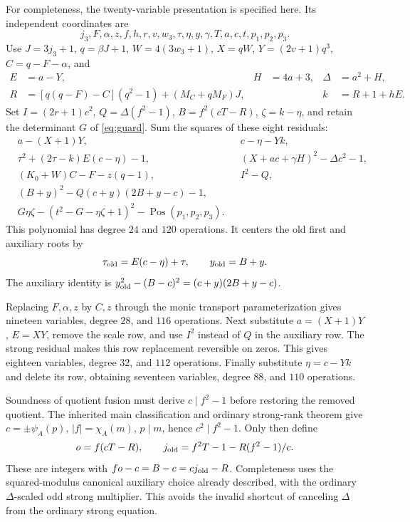 \documentclass[11pt,a4paper]{article}
\theoremstyle{definition}\newtheorem{definition}[theorem]{Definition}
\theoremstyle{remark}\newtheorem{remark}[theorem]{Remark}
\newcommand{\pos}{\operatorname{Pos}}\newcommand{\Pair}{\operatorname{Pair}}
\numberwithin{equation}{section}
\begin{document}
For completeness, the twenty-variable presentation is specified here.
Its independent coordinates are
\[
j_3,F,\alpha,z,f,h,r,v,w_3,\tau,\eta,y,\gamma,T,a,c,t,p_1,p_2,p_3.
\]
Use \(J=3j_3+1\), \(q=\beta J+1\), \(W=4(3w_3+1)\),
\(X=qW\), \(Y=(2v+1)q^3\), \(C=q-F-\alpha\), and
\begin{align*}
E&=a-Y,& H&=4a+3,&\Delta&=a^2+H,\\
R&=[q(q-F)-C](q^2-1)+(M_C+qM_F)J,&&&
k&=R+1+hE.
\end{align*}
Set \(I=(2r+1)c^2\), \(Q=\Delta(f^2-1)\),
\(B=f^2(cT-R)\), \(\zeta=k-\eta\), and retain the determinant
\(G\) of \eqref{eq:guard}. Sum the squares of these eight residuals:
\begin{align*}
&a-(X+1)Y, &&c-\eta-Yk,\\
&\tau^2+(2\tau-k)E(c-\eta)-1,
&&(X+ac+\gamma H)^2-\Delta c^2-1,\\
&(K_0+W)C-F-z(q-1),&&I^2-Q,\\
&(B+y)^2-Q(c+y)(2B+y-c)-1,\\
&G\eta\zeta-(t^2-G-\eta\zeta+1)^2-\pos(p_1,p_2,p_3).
\end{align*}
This polynomial has degree \(24\) and \(120\) operations.
It centers the old first and auxiliary roots by
\[
\tau_{\rm old}=E(c-\eta)+\tau,\qquad y_{\rm old}=B+y.
\]
The auxiliary identity is
\(y_{\rm old}^2-(B-c)^2=(c+y)(2B+y-c)\).

Replacing \(F,\alpha,z\) by \(C,z\) through the monic transport
parameterization gives nineteen variables, degree \(28\), and
\(116\) operations. Next substitute \(a=(X+1)Y\), \(E=XY\),
remove the scale row, and use \(I^2\) instead of \(Q\) in the
auxiliary row. The strong residual makes this row replacement
reversible on zeros. This gives eighteen variables, degree \(32\),
and \(112\) operations. Finally substitute \(\eta=c-Yk\) and
delete its row, obtaining seventeen variables, degree \(88\),
and \(110\) operations.

Soundness of quotient fusion must derive \(c\mid f^2-1\) before
restoring the removed quotient. The inherited main classification
and ordinary strong-rank theorem give
\(c=\pm\psi_A(p)\), \(|f|=\chi_A(m)\), \(p\mid m\), hence
\(c^2\mid f^2-1\). Only then define
\[
o=f(cT-R),\qquad
j_{\rm old}=f^2T-1-R(f^2-1)/c.
\]
These are integers with \(fo-c=B-c=cj_{\rm old}-R\).
Completeness uses the squared-modulus canonical auxiliary choice
already described, with the ordinary \(\Delta\)-scaled odd strong
multiplier. This avoids the invalid shortcut of canceling
\(\Delta\) from the ordinary strong equation.
\end{document}
